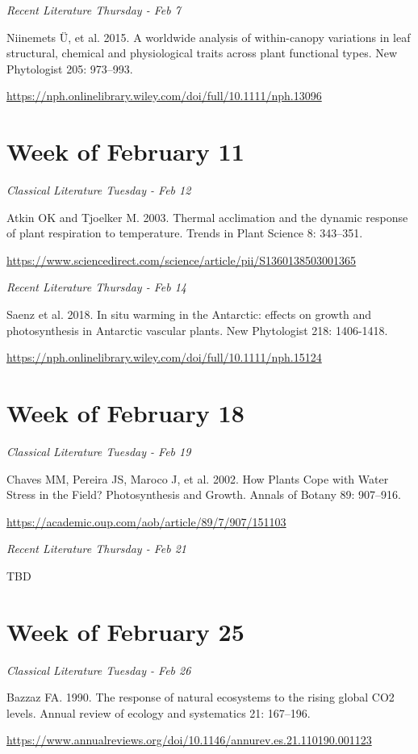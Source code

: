 \documentclass[12pt, notitlepage]{article}   	%
\begin{document}
{\textit{Recent Literature Thursday - Feb 7} \par
Niinemets Ü, et al. 2015. A worldwide analysis of within-canopy variations in leaf 
structural, chemical and physiological traits across plant functional types.
New Phytologist 205: 973–993. \par
\url{https://nph.onlinelibrary.wiley.com/doi/full/10.1111/nph.13096}

\section*{Week of February 11}
\textit{Classical Literature Tuesday - Feb 12} \par
Atkin OK and Tjoelker M. 2003. Thermal acclimation and the dynamic response of plant 
respiration to temperature. Trends in Plant Science 8: 343–351. \par
\url{https://www.sciencedirect.com/science/article/pii/S1360138503001365}

\textit{Recent Literature Thursday - Feb 14} \par
Saenz et al. 2018. In situ warming in the Antarctic: effects on growth and photosynthesis 
in Antarctic vascular plants. New Phytologist 218: 1406-1418. \par
\url{https://nph.onlinelibrary.wiley.com/doi/full/10.1111/nph.15124}

\section*{Week of February 18}
\textit{Classical Literature Tuesday - Feb 19} \par
Chaves MM, Pereira JS, Maroco J, et al. 2002. How Plants Cope with Water Stress 
in the Field? Photosynthesis and Growth. Annals of Botany 89: 907–916. \par
\url{https://academic.oup.com/aob/article/89/7/907/151103}

\textit{Recent Literature Thursday - Feb 21} \par
TBD \par

\section*{Week of February 25}
\textit{Classical Literature Tuesday - Feb 26} \par
Bazzaz FA. 1990. The response of natural ecosystems to the rising global CO2 levels. 
Annual review of ecology and systematics 21: 167–196. \par
\url{https://www.annualreviews.org/doi/10.1146/annurev.es.21.110190.001123}

}
\end{document}
